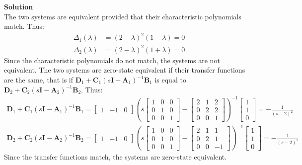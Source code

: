 \documentclass[11pt]{article}
\begin{document}
\begin{enumerate}
{	\textbf{Solution}\\
	The two systems are equivalent provided that their characteristic polynomials match.  Thus:
	\begin{align*}
		\Delta_1(\lambda) &= \left(2-\lambda\right)^2\left(1-\lambda\right) = 0\\
		\Delta_2(\lambda) &= \left(2-\lambda\right)^2\left(1+\lambda\right) = 0
	\end{align*}
	Since the characteristic polynomials do not match, the systems are not equivalent.  The two systems are zero-state equivalent if their transfer functions are the same, that is if $\mathbf{D}_1+\mathbf{C}_1(s\mathbf{I}-\mathbf{A}_1)^{-1}\mathbf{B}_1$ is equal to $\mathbf{D}_2+\mathbf{C}_2(s\mathbf{I}-\mathbf{A}_2)^{-1}\mathbf{B}_2$.  Thus:
	\begin{align*}
		\mathbf{D}_1+\mathbf{C}_1(s\mathbf{I}-\mathbf{A}_1)^{-1}\mathbf{B}_1 = \left[\begin{array}{ccc}1 & -1 & 0\end{array}\right]\left(s\left[\begin{array}{ccc}1 & 0 & 0 \\0 & 1 & 0 \\0 & 0 & 1\end{array}\right]-\left[\begin{array}{ccc}2 & 1 & 2 \\0 & 2 & 2 \\0 & 0 & 1\end{array}\right]\right)^{-1}\left[\begin{array}{c}1 \\1 \\0\end{array}\right]=-\frac{1}{(s-2)^2}\\
		\mathbf{D}_2+\mathbf{C}_2(s\mathbf{I}-\mathbf{A}_2)^{-1}\mathbf{B}_2 = \left[\begin{array}{ccc}1 & -1 & 0\end{array}\right]\left(s\left[\begin{array}{ccc}1 & 0 & 0 \\0 & 1 & 0 \\0 & 0 & 1\end{array}\right]-\left[\begin{array}{ccc}2 & 1 & 1 \\0 & 2 & 1 \\0 & 0 & -1\end{array}\right]\right)^{-1}\left[\begin{array}{c}1 \\1 \\0\end{array}\right]=-\frac{1}{(s-2)^2}
	\end{align*}
	Since the transfer functions match, the systems are zero-state equivalent.
	}
	

\end{enumerate}
\end{document}
